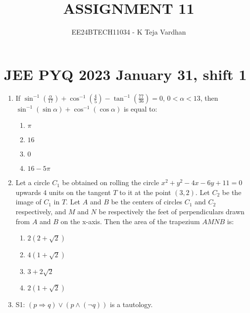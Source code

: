 \documentclass[journal]{IEEEtran}
\newcommand{\brak}[1]{\left( #1 \right)}
\newcommand{\lt}{<}
\begin{document}

\title{ASSIGNMENT 11}
\author{EE24BTECH11034 - K Teja Vardhan}
{\let\newpage\relax\maketitle}

\section{JEE PYQ 2023 January 31, shift 1}
\begin{enumerate}

    \item If $\sin^{-1}\brak{\frac{\alpha}{17}} + \cos^{-1}\brak{\frac{4}{5}} - \tan^{-1}\brak{\frac{77}{36}} = 0$, $0 \lt \alpha \lt 13$, then $\sin^{-1}\brak{\sin \alpha} + \cos^{-1}\brak{\cos \alpha}$ is equal to:
        
        \begin{multicols}{4}
        \begin{enumerate}
        \item $\pi$
        \item $16$
        \item $0$
        \item $16 - 5\pi$
        \end{enumerate}
        \end{multicols}

    \item Let a circle $C_{1}$ be obtained on rolling the circle $x^{2}+y^{2}-4x-6y+11=0$ upwards $4$ units on the tangent $T$ to it at the point $\brak{3, 2}$. Let $C_{2}$ be the image of $C_{1}$ in $T$. Let $A$ and $B$ be the centers of circles $C_{1}$ and $C_{2}$ respectively, and $M$ and $N$ be respectively the feet of perpendiculars drawn from $A$ and $B$ on the x-axis. Then the area of the trapezium $AMNB$ is:
    
        \begin{multicols}{4}
        \begin{enumerate}
        \item $2\brak{2+\sqrt{2}}$
        \item $4\brak{1+\sqrt{2}}$
        \item $3+2\sqrt{2}$
        \item $2\brak{1+\sqrt{2}}$
        \end{enumerate}
        \end{multicols}
        
    \item S1: $\brak{p\Rightarrow q}\lor\brak{p\land\brak{\neg q}}$ is a tautology.


\end{enumerate}
\end{document}

